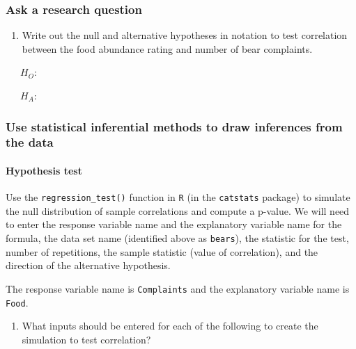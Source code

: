 \documentclass[
]{report}
\providecommand{\tightlist}{%
  \setlength{\itemsep}{0pt}\setlength{\parskip}{0pt}}
\begin{document}
\hypertarget{ask-a-research-question-8}{%
\subsubsection*{Ask a research question}\label{ask-a-research-question-8}}

\begin{enumerate}
\def\labelenumi{\arabic{enumi}.}
\setcounter{enumi}{6}
\tightlist
\item
  Write out the null and alternative hypotheses in notation to test correlation between the food abundance rating and number of bear complaints.
\end{enumerate}

~~~\(H_O:\)

~~~\(H_A:\)

\hypertarget{use-statistical-inferential-methods-to-draw-inferences-from-the-data-8}{%
\subsubsection*{Use statistical inferential methods to draw inferences from the data}\label{use-statistical-inferential-methods-to-draw-inferences-from-the-data-8}}

\hypertarget{hypothesis-test-5}{%
\paragraph*{Hypothesis test}\label{hypothesis-test-5}}

Use the \texttt{regression\_test()} function in \texttt{R} (in the \texttt{catstats} package) to simulate the null distribution of sample correlations and compute a p-value. We will need to enter the response variable name and the explanatory variable name for the formula, the data set name (identified above as \texttt{bears}), the statistic for the test, number of repetitions, the sample statistic (value of correlation), and the direction of the alternative hypothesis.

The response variable name is \texttt{Complaints} and the explanatory variable name is \texttt{Food}.

\begin{enumerate}
\def\labelenumi{\arabic{enumi}.}
\setcounter{enumi}{7}
\tightlist
\item
  What inputs should be entered for each of the following to create the simulation to test correlation?
\end{enumerate}
\end{document}
